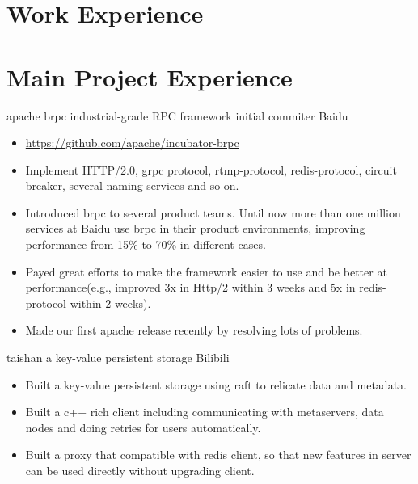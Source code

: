 \documentclass[11pt,a4paper]{moderncv}
\begin{document}
\section{Work Experience}

\section{Main Project Experience}


{apache brpc}
{industrial-grade RPC framework}
{initial commiter}
{Baidu}
{
\begin{itemize}
    \item \url{https://github.com/apache/incubator-brpc}
    \item Implement HTTP/2.0, grpc protocol, rtmp-protocol, redis-protocol, circuit breaker, several naming services and so on.
    \item Introduced brpc to several product teams. Until now more than one million services at Baidu use brpc in their product environments, improving performance from 15\% to 70\% in different cases.
    \item Payed great efforts to make the framework easier to use and be better at performance(e.g., improved 3x in Http/2 within 3 weeks and 5x in redis-protocol within 2 weeks).
    \item Made our first apache release recently by resolving lots of problems.
\end{itemize}
}

{taishan}
{a key-value persistent storage}
{Bilibili}
{}
{
\begin{itemize}
    \item Built a key-value persistent storage using raft to relicate data and metadata.
    \item Built a c++ rich client including communicating with metaservers, data nodes and doing retries for users automatically.
    \item Built a proxy that compatible with redis client, so that new features in server can be used directly without upgrading client.
\end{itemize}
}
\end{document}
